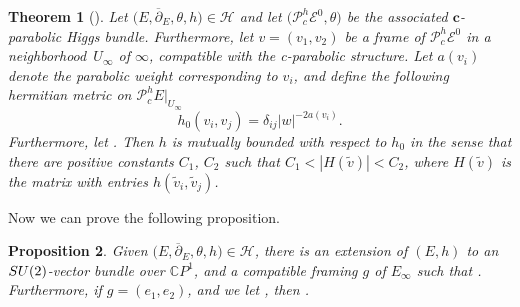 \documentclass[11pt]{article}
\numberwithin{equation}{section}
\newtheorem{Theorem}{Theorem}[section]
\newtheorem{Proposition}[Theorem]{Proposition}
 { \theoremstyle{definition}
\newtheorem{Definition}[Theorem]{Definition}
\newtheorem{Notation}[Theorem]{Notation}
\newtheorem{Example}[Theorem]{Example}
\newtheorem{Remark}[Theorem]{Remark} }
\numberwithin{equation}{section}
\newcommand{\CP}{\mathbb{C}P^1}
\begin{document}
\begin{Theorem}[{\cite[Proposition 8.1.1]{M}}]\label{FT2} Let $\bigl(E,\overline{\partial}_E,\theta,h\bigr)\in \mathcal{H}$ and let $\bigl(\mathcal{P}^h_{c}\mathcal{E}^{0},\theta\bigr)$ be the associated $\boldsymbol{c}$-parabolic Higgs bundle. Furthermore, let $v=(v_1,v_2)$ be a frame of $\mathcal{P}^h_{c}\mathcal{E}^{0}$ in a neighborhood~$U_{\infty}$ of $\infty$, compatible with the c-parabolic structure. Let $a(v_i)$ denote the parabolic weight corresponding to $v_{i}$, and define the following hermitian metric on $\mathcal{P}^h_{c}E|_{U_{\infty}}$
\begin{equation*}
 h_0(v_{i},v_{j})=\delta_{ij}|w|^{-2a(v_i)}.
\end{equation*}
Furthermore, let . Then $h$ is mutually bounded with respect to $h_0$ in the sense that there are positive constants $C_1$, $C_2$ such that
$
 C_1<|H(\widetilde{v})|<C_2$,
where $H(\widetilde{v})$ is the matrix with entries $h(\widetilde{v}_{i},\widetilde{v}_{j})$.
\end{Theorem}

Now we can prove the following proposition.

\begin{Proposition} \label{constructionframe} Given $\bigl(E,\overline{\partial}_E,\theta,h\bigr)\in \mathcal{H}$, there is an extension of $(E,h)$ to an ${\rm SU}(2)$-vector bundle over $\CP$, and a compatible framing $g$ of $E_{\infty}$ such that . Further\-mo\-re, if $g=(e_1,e_2)$,  and we let , then .
\end{Proposition}
\end{document}
